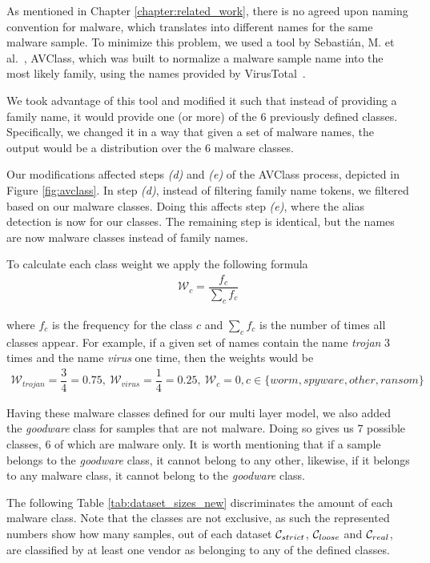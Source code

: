 As mentioned in Chapter \ref{chapter:related_work}, there is no agreed upon naming convention for malware, which translates into different names for the same malware sample.
To minimize this problem, we used a tool by Sebastián, M. et al.~\cite{sebastian2016avclass}, AVClass, which was built to normalize a malware sample name into the most likely family, using the names provided by VirusTotal~\cite{tool:virustotal}.

We took advantage of this tool and modified it such that instead of providing a family name, it would provide one (or more) of the 6 previously defined classes.
Specifically, we changed it in a way that given a set of malware names, the output would be a distribution over the 6 malware classes.

Our modifications affected steps \textit{(d)} and \textit{(e)} of the AVClass process, depicted in Figure \ref{fig:avclass}.
In step \textit{(d)}, instead of filtering family name tokens, we filtered based on our malware classes.
Doing this affects step \textit{(e)}, where the alias detection is now for our classes.
The remaining step is identical, but the names are now malware classes instead of family names.

To calculate each class weight we apply the following formula
\begin{eqnarray*}
	\mathcal{W}_c = \dfrac{f_c}{\sum\limits_{c}f_c}
\end{eqnarray*}

where $f_c$ is the frequency for the class $c$ and $\sum_{c}f_c$ is the number of times all classes appear.
For example, if a given set of names contain the name \textit{trojan} 3 times and the name \textit{virus} one time, then the weights would be
\begin{eqnarray*}
	\mathcal{W}_{trojan}=\dfrac{3}{4}=0.75,~\mathcal{W}_{virus}=\dfrac{1}{4}=0.25,~ \mathcal{W}_{c}=0, c \in \{worm, spyware, other, ransom\}
\end{eqnarray*}

\medskip

Having these malware classes defined for our multi layer model, we also added the \textit{goodware} class for samples that are not malware.
Doing so gives us 7 possible classes, 6 of which are malware only.
It is worth mentioning that if a sample belongs to the \textit{goodware} class, it cannot belong to any other, likewise, if it belongs to any malware class, it cannot belong to the \textit{goodware} class.

The following Table \ref{tab:dataset_sizes_new} discriminates the amount of each malware class.
Note that the classes are not exclusive, as such the represented numbers show how many samples, out of each dataset $\mathcal{C}_{strict}$, $\mathcal{C}_{loose}$ and $\mathcal{C}_{real}$, are classified by at least one vendor as belonging to any of the defined classes.

